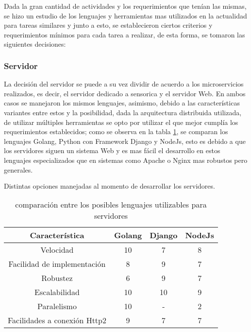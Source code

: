     Dada la gran cantidad de actividades y los requerimientos que tenían las mismas,
    se hizo un estudio de los lenguajes y herramientas mas utilizados en
    la actualidad para tareas similares y junto a esto, se establecieron
    ciertos criterios y requerimientos mínimos para cada tarea a realizar, de
    esta forma, se tomaron las siguientes decisiones:

    \subsubsection{Servidor}
    La decisión del servidor se puede a su vez dividir de acuerdo a los
    microservicios realizados, es decir, el servidor dedicado a sensorica y
    el servidor Web. En ambos casos se manejaron los mismos lenguajes, asimismo, debido a
    las características variantes entre estos y la posibilidad, dada la arquitectura
    distribuida utilizada, de utilizar múltiples herramientas se opto por utilizar
    el que mejor cumplía los requerimientos establecidos; como se observa en la
    tabla \ref{tab:LenguajesServidor}, se comparan los lenguajes Golang, Python
    con Framework Django y NodeJs, esto es debido a que los servidores siguen un
    sistema Web y es mas fácil el desarrollo en estos lenguajes especializados que
    en sistemas como Apache o Nginx mas robustos pero generales.

    \begin{table}[ht]
        \begin{center}
            Distintas opciones manejadas al momento de desarrollar los servidores.\\

            \vspace{0.3cm}
            \begin{tabular}{|c|c|c|c|}
                \hline
                Característica              & Golang & Django & NodeJs\\\hline
                Velocidad                   & 10    & 7     &   8   \\\hline
                Facilidad de implementación & 8     & 9     &  7\\\hline
                Robustez                    & 6     & 9     & 7 \\\hline
                Escalabilidad               & 10    & 10    & 9 \\\hline
                Paralelismo                 & 10    & -     & 2 \\\hline
                Facilidades a conexión Http2& 9     &7      & 7 \\
                \hline
            \end{tabular}
        \end{center}
        \caption[Comparativa de posibles lenguajes nivel servidor]{comparación entre
        los posibles lenguajes utilizables para servidores}
        \label{tab:LenguajesServidor}
    \end{table}

